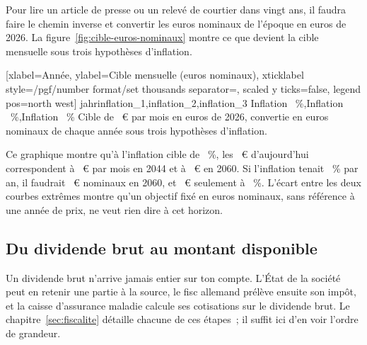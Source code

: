 Pour lire un article de presse ou un relev\'e de courtier dans vingt ans, il faudra faire le chemin
inverse et convertir les euros nominaux de l'\'epoque en euros de 2026. La
figure~\ref{fig:cible-euros-nominaux} montre ce que devient la cible mensuelle sous trois hypoth\`eses
d'inflation.

[xlabel={Ann\'ee}, ylabel={Cible mensuelle (euros nominaux)},
  xticklabel style={/pgf/number format/set thousands separator={}}, scaled y ticks=false,
  legend pos=north west]%
  {jahr}{inflation_1,inflation_2,inflation_3}%
  {{Inflation \InflationBas~\%},{Inflation \InflationZiel~\%},{Inflation \InflationHaut~\%}}%
  {Cible de \ZielMonat~€ par mois en euros de 2026, convertie en euros nominaux de chaque ann\'ee
  sous trois hypoth\`eses d'inflation.\label{fig:cible-euros-nominaux}}

Ce graphique montre qu'\`a l'inflation cible de \InflationZiel~\%, les \ZielMonat~€ d'aujourd'hui
correspondent \`a \ZielNominalXLIV~€ par mois en 2044 et \`a \ZielNominalLX~€ en 2060. Si l'inflation
tenait \InflationHaut~\% par an, il faudrait \ZielNominalLXHaut~€ nominaux en 2060, et
\ZielNominalLXBas~€ seulement \`a \InflationBas~\%. L'\'ecart entre les deux courbes extr\^emes montre
qu'un objectif fix\'e en euros nominaux, sans r\'ef\'erence \`a une ann\'ee de prix, ne veut rien
dire \`a cet horizon.

\subsection{Du dividende brut au montant disponible}\label{sec:depart-cascade}

Un dividende brut n'arrive jamais entier sur ton compte. L'\'Etat de la soci\'et\'e peut en retenir
une partie \`a la source, le fisc allemand pr\'el\`eve ensuite son imp\^ot, et la caisse d'assurance
maladie calcule ses cotisations sur le dividende brut. Le chapitre~\ref{sec:fiscalite} d\'etaille
chacune de ces \'etapes~; il suffit ici d'en voir l'ordre de grandeur.



